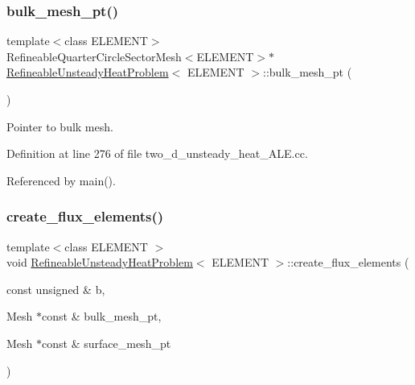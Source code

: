 \subsubsection{\texorpdfstring{bulk\+\_\+mesh\+\_\+pt()}{bulk\_mesh\_pt()}}
{\footnotesize\ttfamily template$<$class E\+L\+E\+M\+E\+NT$>$ \\
Refineable\+Quarter\+Circle\+Sector\+Mesh$<$E\+L\+E\+M\+E\+NT$>$$\ast$ \hyperlink{classRefineableUnsteadyHeatProblem}{Refineable\+Unsteady\+Heat\+Problem}$<$ E\+L\+E\+M\+E\+NT $>$\+::bulk\+\_\+mesh\+\_\+pt (\begin{DoxyParamCaption}{ }\end{DoxyParamCaption})\hspace{0.3cm}{\ttfamily [inline]}}



Pointer to bulk mesh. 



Definition at line 276 of file two\+\_\+d\+\_\+unsteady\+\_\+heat\+\_\+\+A\+L\+E.\+cc.



Referenced by main().

\mbox{\label{classRefineableUnsteadyHeatProblem_a65601ec64c73ac578b43f4af04c46569}} 
\subsubsection{\texorpdfstring{create\+\_\+flux\+\_\+elements()}{create\_flux\_elements()}}
{\footnotesize\ttfamily template$<$class E\+L\+E\+M\+E\+NT $>$ \\
void \hyperlink{classRefineableUnsteadyHeatProblem}{Refineable\+Unsteady\+Heat\+Problem}$<$ E\+L\+E\+M\+E\+NT $>$\+::create\+\_\+flux\+\_\+elements (\begin{DoxyParamCaption}\item[{const unsigned \&}]{b,  }\item[{Mesh $\ast$const \&}]{bulk\+\_\+mesh\+\_\+pt,  }\item[{Mesh $\ast$const \&}]{surface\+\_\+mesh\+\_\+pt }\end{DoxyParamCaption})}



